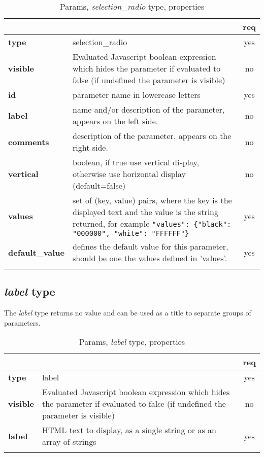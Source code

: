 \begin{longtable}{|>{\bf}L{\linewidth}|L{\linewidth}|c|}
\hline
      &  & {\bf req} 
\tabularnewline \hline \hline
 type     & selection\_radio    & yes \\ \hline
 visible  & Evaluated Javascript boolean expression which hides the parameter if
            evaluated to false (if undefined the parameter is visible)& no \\ \hline
 id       & parameter name in lowercase letters & yes \\ \hline
 label  & name and/or description of the parameter, appears on the left side. & no
                      \\ \hline
 comments & description of the parameter, appears on the right side. & no
                      \\ \hline
 vertical & boolean, if true use vertical display, otherwise use horizontal
            display (default=false) & no \\ \hline
 values   & set of (key, value) pairs, where the key is the displayed text and the 
value is the string returned, for example \texttt{"values": \{"black": "000000", "white": "FFFFFF"\}} & yes
                      \\ \hline
 default\_value & defines the default value for this parameter, should be one 
the values defined in 'values'. & yes \\ \hline
\caption{Params, \emph{selection\_radio} type, properties}
\end{longtable}

\subsection{ \emph{label} type}

The \emph{label} type returns no value and can be used as a title to separate groups of parameters.

\begin{longtable}{|>{\bf}L{\linewidth}|L{\linewidth}|c|}
\hline
      &  & {\bf req} 
\tabularnewline \hline \hline
 type  & label       & yes \\ \hline
 visible  & Evaluated Javascript boolean expression which hides the parameter if
            evaluated to false (if undefined the parameter is visible)& no \\ \hline
 label & HTML text to display, as a single string or as an array of strings& yes
                      \\ \hline
\caption{Params, \emph{label} type, properties}
\end{longtable}


